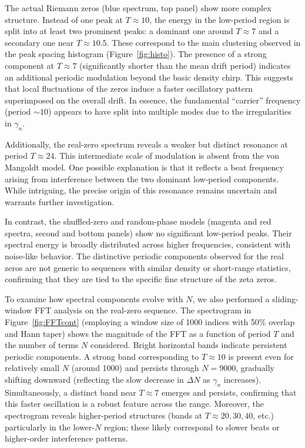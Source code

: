 \documentclass[11pt]{amsart}
\begin{document}
The actual Riemann zeros (blue spectrum, top panel) show more complex structure.  
Instead of one peak at $T\approx10$, the energy in the low-period region is split into at least two prominent peaks: a dominant one around $T\approx 7$ and a secondary one near $T\approx 10.5$.  
These correspond to the main clustering observed in the peak spacing histogram (Figure~\ref{fig:histo}). 
The presence of a strong component at $T\approx7$ (significantly shorter than the mean drift period) indicates an additional periodic modulation beyond the basic density chirp. 
This suggests that local fluctuations of the zeros induce a faster oscillatory pattern superimposed on the overall drift.  
In essence, the fundamental ``carrier'' frequency (period $\sim 10$) appears to have split into multiple modes due to the irregularities in $\gamma_n$. 

Additionally, the real-zero spectrum reveals a weaker but distinct resonance at period $T \approx 24$. 
This intermediate scale of modulation is absent from the von Mangoldt model. 
One possible explanation is that it reflects a beat frequency arising from
interference between the two dominant low-period components.
While intriguing, the precise origin of this resonance remains uncertain and warrants further investigation.

In contrast, the shuffled-zero and random-phase models (magenta and red spectra, second and bottom panels) show no significant low-period peaks.  
Their spectral energy is broadly distributed across higher frequencies, consistent with noise-like behavior.  
The distinctive periodic components observed for the real zeros are not generic to sequences with similar density or short-range statistics, confirming that they are tied to the specific fine structure of the zeta zeros.

To examine how spectral components evolve with $N$, we also performed a sliding-window FFT analysis on the real-zero sequence. 
The spectrogram in Figure~\ref{fig:FFTcont} (employing a window size of 1000 indices with 50\% overlap and Hann taper) shows the magnitude of the FFT as a function of period $T$ and the number of terms $N$ considered.  
Bright horizontal bands indicate persistent periodic components.  
A strong band corresponding to $T\approx10$ is present even for relatively small $N$ (around 1000) and persists through $N=9000$, gradually shifting downward (reflecting the slow decrease in $\Delta N$ as $\gamma_n$ increases). 
Simultaneously, a distinct band near $T\approx7$ emerges and persists, confirming that this faster oscillation is a robust feature across the range.  
Moreover, the spectrogram reveals higher-period structures (bands at $T\approx20, 30, 40$, etc.) particularly in the lower-$N$ region; these likely correspond to slower beats or higher-order interference patterns.
\end{document}
